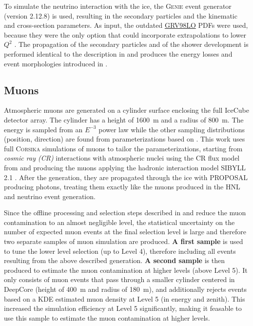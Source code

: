 To simulate the neutrino interaction with the ice, the \textsc{Genie} event generator  (version 2.12.8) is used, resulting in the secondary particles and the kinematic and cross-section parameters. As input, the outdated \href{https://internal.dunescience.org/doxygen/classgenie_1_1GRV89LO.html}{GRV98LO}  PDFs were used, because they were the only option that could incorporate extrapolations to lower $Q^2$ . The propagation of the secondary particles and of the shower development is performed identical to the description in  and produces the energy losses and event morphologies introduced in .


\subsection{Muons}

Atmospheric muons are generated on a cylinder surface enclosing the full IceCube detector array. The cylinder has a height of \SI{1600}{\meter} and a radius of \SI{800}{\meter}. The energy is sampled from an $E^{-3}$ power law while the other sampling distributions (position, direction) are found from parameterizations based on . This work uses full \textsc{Corsika}  simulations of muons to tailor the parameterizations, starting from \textit{cosmic ray (CR)} interactions with atmospheric nuclei using the CR flux model from  and producing the muons applying the hadronic interaction model SIBYLL 2.1 . After the generation, they are propagated through the ice with PROPOSAL producing photons, treating them exactly like the muons produced in the HNL and neutrino event generation.

Since the offline processing and selection steps described in  and  reduce the muon contamination to an almost negligible level, the statistical uncertainty on the number of expected muon events at the final selection level is large and therefore two separate samples of muon simulation are produced. \textbf{A first sample} is used to tune the lower level selection (up to Level 4), therefore including all events resulting from the above described generation. \textbf{A second sample} is then produced to estimate the muon contamination at higher levels (above Level 5). It only consists of muon events that pass through a smaller cylinder centered in DeepCore (height of \SI{400}{\meter} and radius of \SI{180}{\meter}), and additionally rejects events based on a KDE estimated muon density at Level 5 (in energy and zenith). This increased the simulation efficiency at Level 5 significantly, making it feasable to use this sample to estimate the muon contamination at higher levels.


